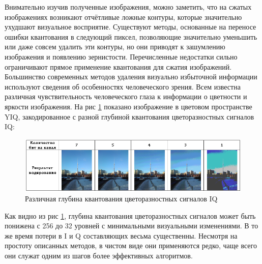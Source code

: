 Внимательно изучив полученные изображения, можно заметить, что на сжатых изображениях возникают отчётливые ложные контуры, которые значительно ухудшают визуальное восприятие. Существуют методы, основанные на переносе ошибки квантования в следующий пиксел, позволяющие значительно уменьшить или даже совсем удалить эти контуры, но они приводят к зашумлению изображения и появлению зернистости. Перечисленные недостатки сильно ограничивают прямое применение квантования для сжатия изображений.
Большинство современных методов удаления визуально избыточной информации используют сведения об особенностях человеческого зрения. Всем известна различная чувствительность человеческого глаза к информации о цветности и яркости изображения. На рис \ref{pic:quantization} показано изображение в цветовом пространстве YIQ, закодированное с разной глубиной квантования цветоразностных сигналов IQ:
\begin{figure}[H]
	\begin{center}
		\includegraphics[scale=0.75]{pics/quantization/quantization.png}
		\caption{Различная глубина квантования цветоразностных сигналов IQ} 
		\label{pic:quantization}
	\end{center}
\end{figure}
Как видно из рис \ref{pic:quantization}, глубина квантования цветоразностных сигналов может быть понижена с 256 до 32 уровней с минимальными визуальными изменениями. В то же время потери в I и Q составляющих весьма существенны. Несмотря на простоту описанных методов, в чистом виде они применяются редко, чаще всего они служат одним из шагов более эффективных алгоритмов.

